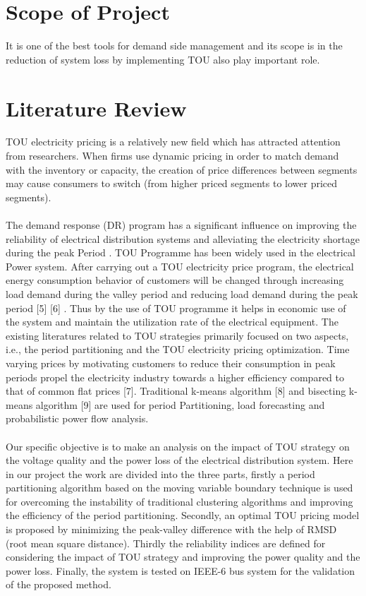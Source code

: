 \documentclass[12pt]{article}
\begin{document}
\section{Scope of Project}
It is one of the best tools for demand side management and its scope is in the
reduction of system loss by implementing TOU also play important role.
\pagebreak
\section{Literature Review}
TOU electricity pricing is a relatively new field which has attracted attention from
researchers. When firms use dynamic pricing in order to match demand with the
inventory or capacity, the creation of price differences between segments may
cause consumers to switch (from higher priced segments to lower priced segments).\\\\

The demand response (DR) program has a significant influence on improving
the reliability of electrical distribution systems and alleviating the electricity shortage during the peak Period\cite{yang2012game}
\cite{sheen1994time}
\cite{zhou2017multiobjective}
\cite{zeng2018hybrid} . TOU Programme has been widely used
in the electrical Power system. After carrying out a TOU electricity price program,
the electrical energy consumption behavior of customers will be changed through
increasing load demand during the valley period and reducing load demand during
the peak period [5] [6] . Thus by the use of TOU programme it helps in economic
use of the system and maintain the utilization rate of the electrical equipment. The
existing literatures related to TOU strategies primarily focused on two aspects,
i.e., the period partitioning and the TOU electricity pricing optimization. Time
varying prices by motivating customers to reduce their consumption in peak periods propel the electricity industry towards a higher efficiency compared to that of
common flat prices [7]. Traditional k-means algorithm [8] and bisecting k-means
algorithm [9] are used for period Partitioning, load forecasting and probabilistic
power flow analysis.\\\\

Our specific objective is to make an analysis on the impact of TOU strategy on
the voltage quality and the power loss of the electrical distribution system. Here in
our project the work are divided into the three parts, firstly a period partitioning algorithm based on the moving variable boundary technique is used for overcoming
the instability of traditional clustering algorithms and improving the efficiency of
the period partitioning. Secondly, an optimal TOU pricing model is proposed by
minimizing the peak-valley difference with the help of RMSD (root mean square
distance). Thirdly the reliability indices are defined for considering the impact of
TOU strategy and improving the power quality and the power loss. Finally, the
system is tested on IEEE-6 bus system for the validation of the proposed method.\\
\pagebreak
\end{document}
